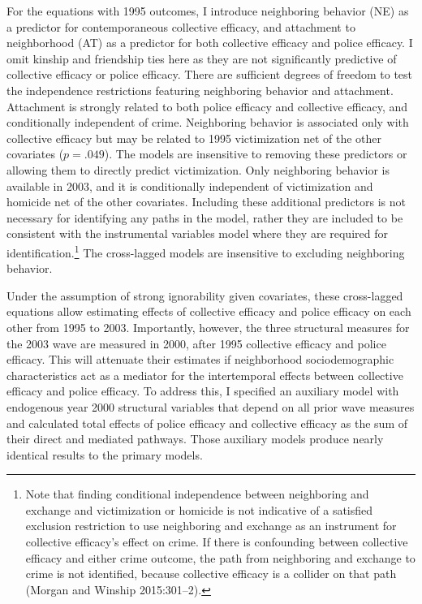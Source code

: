 \documentclass [11pt, proquest] {uwthesis}[2015/03/03]
\begin{document}
For the equations with 1995 outcomes, I introduce neighboring behavior (NE) as a predictor for contemporaneous collective efficacy, and attachment to neighborhood (AT) as a predictor for both collective efficacy and police efficacy. I omit kinship and friendship ties here as they are not significantly predictive of collective efficacy or police efficacy. There are sufficient degrees of freedom to test the independence restrictions featuring neighboring behavior and attachment. Attachment is strongly related to both police efficacy and collective efficacy, and conditionally independent of crime. Neighboring behavior is associated only with collective efficacy but may be related to 1995 victimization net of the other covariates (\(p=.049\)). The models are insensitive to removing these predictors or allowing them to directly predict victimization. Only neighboring behavior is available in 2003, and it is conditionally independent of victimization and homicide net of the other covariates. Including these additional predictors is not necessary for identifying any paths in the model, rather they are included to be consistent with the instrumental variables model where they are required for identification.\footnote{Note that finding conditional independence between neighboring and exchange and victimization or homicide is not indicative of a satisfied exclusion restriction to use neighboring and exchange as an instrument for collective efficacy's effect on crime. If there is confounding between collective efficacy and either crime outcome, the path from neighboring and exchange to crime is not identified, because collective efficacy is a collider on that path (Morgan and Winship 2015:301--2).} The cross-lagged models are insensitive to excluding neighboring behavior.

Under the assumption of strong ignorability given covariates, these cross-lagged equations allow estimating effects of collective efficacy and police efficacy on each other from 1995 to 2003. Importantly, however, the three structural measures for the 2003 wave are measured in 2000, after 1995 collective efficacy and police efficacy. This will attenuate their estimates if neighborhood sociodemographic characteristics act as a mediator for the intertemporal effects between collective efficacy and police efficacy. To address this, I specified an auxiliary model with endogenous year 2000 structural variables that depend on all prior wave measures and calculated total effects of police efficacy and collective efficacy as the sum of their direct and mediated pathways. Those auxiliary models produce nearly identical results to the primary models.
\end{document}
